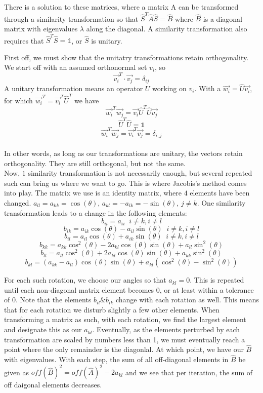 \documentclass[10pt, twocolumn]{article}
\begin{document}
There is a solution to these matrices, where a matrix A can be transformed through a similarity 
transformation so that $\hat{S}^T \hat{A} \hat{S} = \hat{B}$ where $\hat{B}$ is a diagonal matrix 
with eigenvalues $\lambda$ along the diagonal. A similarity transformation also requires that 
$\hat{S}^T\hat{S} = \mathds{1}$, or $\hat{S}$ is unitary. 

First off, we must show that the unitatry transformations retain orthogonality. 
We start off with an assumed orthonormal set $v_i$, so
\[
\vec{v_i}^T \cdot \vec{v_j} = \delta_{ij}
\]
A unitary transformation means an operator $U$ working on $v_i$.
With a $\vec{w_{i}} = \hat{U}\vec{v_{i}}$, for which 
$\vec{w_{i}}^T = \vec{v_{i}}^T\hat{U}^T$ we have 
\[
    \vec{w_{i}}^T\vec{w_{j}} = \vec{v_i} \hat{U}^T \hat{U} \vec{v_j} 
\]
\[
    \hat{U}^T \hat{U} = \mathds{1} 
\]
\[
    \vec{w_i}^T\vec{w_j} = \vec{v_i}^T\vec{v_j} = \delta_{i,j}
\]\\
In other words, as long as our transformations are unitary, the vectors retain 
orthogonality. They are still orthogonal, but not the same. \\

Now, $1$ similarity transformation is not necessarily enough, but several repeated such can 
bring us where we want to go. This is where Jacobis's method comes into play. The matrix we use is
an identity matrix, where $4$ elements have been changed. $a_{ll} = a_{kk} = \cos(\theta)$, 
$a_{kl} = -a_{lk} = -\sin(\theta)$, $j \neq k$. One similarity transformation leads to a change in 
the following elements: 
\[ b_{ii} = a_{ii} \; \; i \neq k, i \neq l \]
\[ b_{ik} = a_{ik}\cos(\theta) - a_{il}\sin(\theta) \; \; i \neq k, i \neq l \]
\[ b_{il} = a_{il}\cos(\theta) + a_{ik}\sin(\theta) \; \; i \neq k, i \neq l \]
\[ b_{kk} = a_{kk}\cos^2(\theta) - 2a_{kl}\cos(\theta)\sin(\theta) + a_{ll}\sin^2(\theta) \]
\[ b_{ll} = a_{ll}\cos^2(\theta) + 2a_{kl}\cos(\theta)\sin(\theta) + a_{kk}\sin^2(\theta) \]
\[ b_{kl} = (a_{kk} - a_{ll})\cos(\theta)\sin(\theta) + a_{kl}(\cos^2(\theta) - \sin^2(\theta)) \]

For each such rotation, we choose our angles so that $a_{kl} = 0$. This is repeated until each non-diagonal
matrix element becomes 0, or at least within a tolerance of 0. Note that the elements $b_{il} \& b_{ik}$
change with each rotation as well. This means that for each rotation we disturb slightly a few other 
elements. When transforming a matrix as such, with each rotation, we find the largest element and designate
this as our $a_{kl}$. Eventually, as the elements perturbed by each transformation are scaled by numbers less
than 1, we must eventually reach a point where the only remainder is the diagonlal. At which point, we have
our $\hat{B}$ with eigenvalues. With each step, the sum of all off-diagonal elements in $\hat{B}$ be given 
as $off{(\hat{B})}^2 = off{(\hat{A})}^2 - 2a_{kl}$ and we see that per iteration, the sum of off daigonal elements 
decreases. 
\end{document}
